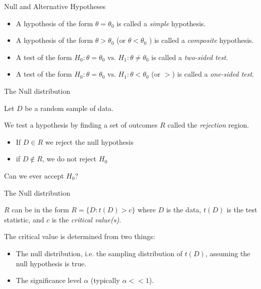 \documentclass{beamer}
\begin{document}
\begin{frame}{Null and Alternative Hypotheses}

	\begin{itemize}
		\item A hypothesis of the form $\theta = \theta_0$ is called a \textit{simple} hypothesis.
		\item A hypothesis of the form $\theta > \theta_0$ (or $\theta < \theta_0$ ) is called a \textit{composite} hypothesis.
	\end{itemize}

	\vskip 0.5cm

	\begin{itemize}
		\item A test of the form $H_0: \theta = \theta_0 \text{ vs. } H_1: \theta \neq \theta_0$ is called a
	\textit{two-sided test}.
		\item A test of the form $H_0: \theta = \theta_0 \text{ vs. } H_1:\theta < \theta_0$ (or $>$) is called a \textit{one-sided test}.
	\end{itemize}

\end{frame}

\begin{frame}{The Null distribution}

	Let $D$ be a random sample of data.

	We test a hypothesis by finding a set of outcomes $R$ called the
	\textit{rejection} region. 

	\begin{itemize}
		\item If $D \in R$ we reject the null hypothesis
		\item if $D \not\in R$, we do not reject $H_0$
	\end{itemize}

	Can we ever accept $H_0$?

\end{frame}

\begin{frame}{The Null distribution}

	$R$ can be in the form $R=\{D:t(D)>c\}$ where $D$ is the data, $t(D)$ is the test statistic, 
	and $c$ is the \textit{critical value(s)}.

	\vskip 0.5cm
	
	The critical value is determined from two things:
	\begin{itemize}
		\item The null distribution, i.e. the sampling distribution of $t(D)$, assuming the null hypothesis is true.
		\item The significance level $\alpha$ (typically $\alpha <<1$).
	\end{itemize}

\end{frame}
\end{document}
